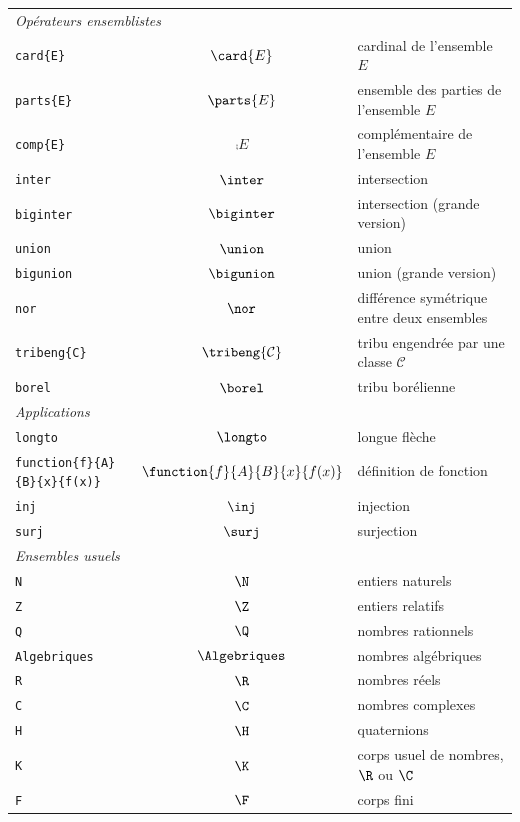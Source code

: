 \documentclass[print]{atomathematyk}
\begin{document}
\begin{longtable}{lcl}
  \multicolumn{3}{l}{\emph{Opérateurs ensemblistes}}\\
  \texttt{card\{E\}} & \(\card{E}\) & cardinal de l’ensemble \(E\)\\
  \texttt{parts\{E\}} & \(\parts{E}\) & ensemble des parties de l’ensemble \(E\)\\
  \texttt{comp\{E\}} & \(\comp{E}\) & complémentaire de l’ensemble \(E\)\\
  \texttt{inter} & \(\inter\) & intersection\\
  \texttt{biginter} & \(\biginter\) & intersection (grande version)\\
  \texttt{union} & \(\union\) & union\\
  \texttt{bigunion} & \(\bigunion\) & union (grande version)\\
  \texttt{nor} & \(\nor\) & différence symétrique entre deux ensembles\\
  \texttt{tribeng\{C\}} & \(\tribeng{\mathcal{C}}\) & tribu engendrée par une classe \(\mathcal{C}\)\\
  \texttt{borel} & \(\borel\) & tribu borélienne\\
  \multicolumn{3}{l}{\emph{Applications}}\\
  \texttt{longto} & \(\longto\) & longue flèche \\
  \texttt{function\{f\}\{A\}\{B\}\{x\}\{f(x)\}} & \(\function{f}{A}{B}{x}{f(x)}\) & définition de fonction \\
  \texttt{inj} & \(\inj\) & injection\\
  \texttt{surj} & \(\surj\) & surjection\\
  \multicolumn{3}{l}{\emph{Ensembles usuels}}\\
  \texttt{N} & \(\N\) & entiers naturels\\
  \texttt{Z} & \(\Z\) & entiers relatifs\\
  \texttt{Q} & \(\Q\) & nombres rationnels\\
  \texttt{Algebriques} & \(\Algebriques\) & nombres algébriques\\
  \texttt{R} & \(\R\) & nombres réels\\
  \texttt{C} & \(\C\) & nombres complexes\\
  \texttt{H} & \(\H\) & quaternions\\
  \texttt{K} & \(\K\) & corps usuel de nombres, \(\R\) ou \(\C\)\\
  \texttt{F} & \(\F\) & corps fini\\

\end{longtable}
\end{document}
